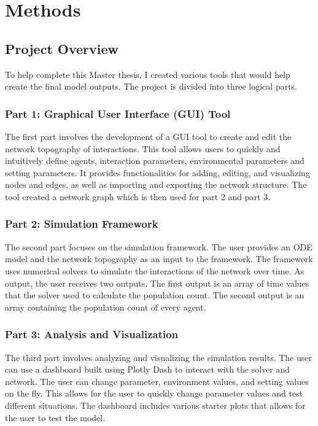 \chapter{Methods}
\label{Methods}
\section{Project Overview}
To help complete this Master thesis, I created various tools that would help create the final model outputs. 
The project is divided into three logical parts. 

\subsection{Part 1: Graphical User Interface (GUI) Tool}
The first part involves the development of a GUI tool to create and edit the network topography of interactions. 
This tool allows users to quickly and intuitively define agents, interaction parameters, environmental parameters and setting parameters. 
It provides functionalities for adding, editing, and visualizing nodes and edges, as well as importing and exporting the network structure. 
The tool created a network graph which is then used for part 2 and part 3. 

\subsection{Part 2: Simulation Framework}
The second part focuses on the simulation framework. 
The user provides an ODE model and the network topography as an input to the framework. 
The framework uses numerical solvers to simulate the interactions of the network over time.
As output, the user receives two outputs.
The first output is an array of time values that the solver used to calculate the population count. 
The second output is an array containing the population count of every agent. 

\subsection{Part 3: Analysis and Visualization}
The third part involves analyzing and visualizing the simulation results. 
The user can use a dashboard built using Plotly Dash to interact with the solver and network. 
The user can change parameter, environment values, and setting values on the fly. 
This allows for the user to quickly change parameter values and test different situations. 
The dashboard includes various starter plots that allows for the user to test the model. 

